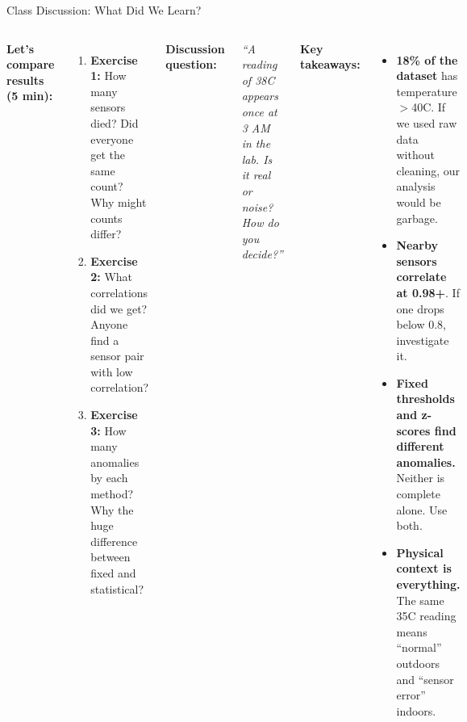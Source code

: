 \documentclass[aspectratio=169,11pt]{beamer}
\begin{document}
\begin{frame}[shrink=5]{Class Discussion: What Did We Learn?}
    \begin{columns}
        \textbf{Let's compare results (5 min):}

        \vspace{0.15cm}
        \begin{enumerate}
            \item \textbf{Exercise 1:} How many sensors died? Did everyone get the same count? Why might counts differ?

            \item \textbf{Exercise 2:} What correlations did we get? Anyone find a sensor pair with low correlation?

            \item \textbf{Exercise 3:} How many anomalies by each method? Why the huge difference between fixed and statistical?
        \end{enumerate}

        \vspace{0.1cm}
        \textbf{Discussion question:}

        \vspace{0.1cm}
        \textit{``A reading of 38\textdegree{}C appears once at 3 AM in the lab. Is it real or noise? How do you decide?''}

        \textbf{Key takeaways:}

        \vspace{0.15cm}
        \begin{itemize}
            \item \textbf{18\% of the dataset} has temperature $>$40\textdegree{}C. If we used raw data without cleaning, our analysis would be garbage.

            \item \textbf{Nearby sensors correlate at 0.98+}. If one drops below 0.8, investigate it.

            \item \textbf{Fixed thresholds and z-scores find different anomalies.} Neither is complete alone. Use both.

            \item \textbf{Physical context is everything.} The same 35\textdegree{}C reading means ``normal'' outdoors and ``sensor error'' indoors.
        \end{itemize}

        \vspace{0.1cm}
    \end{columns}
\end{frame}
\end{document}
